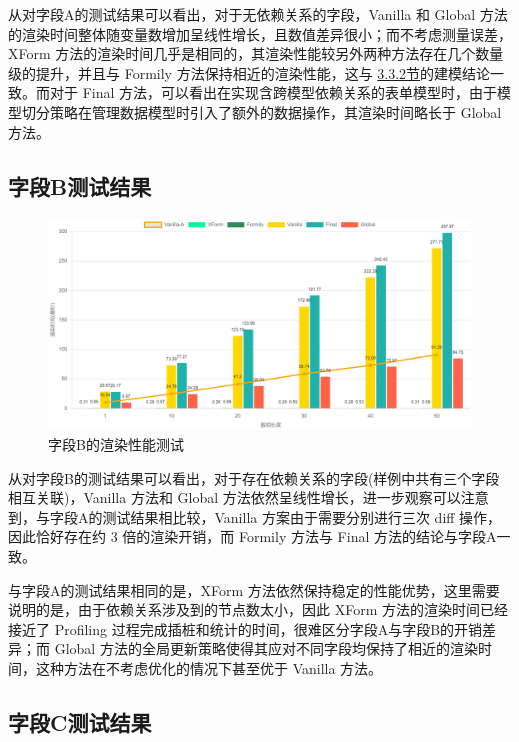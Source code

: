 \documentclass[winfonts,master,twoside]{njuthesis}
\begin{document}
从对字段A的测试结果可以看出，对于无依赖关系的字段，Vanilla 和 Global 方法的渲染时间整体随变量数增加呈线性增长，且数值差异很小；而不考虑测量误差， XForm 方法的渲染时间几乎是相同的，其渲染性能较另外两种方法存在几个数量级的提升，并且与 Formily 方法保持相近的渲染性能，这与 \hyperref[final-solution]{3.3.2节}的建模结论一致。而对于 Final 方法，可以看出在实现含跨模型依赖关系的表单模型时，由于模型切分策略在管理数据模型时引入了额外的数据操作，其渲染时间略长于 Global 方法。

\subsection{字段B测试结果}

\begin{figure}[h]
    \centering
    \includegraphics[width=\textwidth]{figure/chapter-5/B-update.png}
    \caption{字段B的渲染性能测试}
    \label{render-performence-testcase-B}
\end{figure}

从对字段B的测试结果可以看出，对于存在依赖关系的字段(样例中共有三个字段相互关联)，Vanilla 方法和 Global 方法依然呈线性增长，进一步观察可以注意到，与字段A的测试结果相比较，Vanilla 方案由于需要分别进行三次 diff 操作，因此恰好存在约 3 倍的渲染开销，而 Formily 方法与 Final 方法的结论与字段A一致。

与字段A的测试结果相同的是，XForm 方法依然保持稳定的性能优势，这里需要说明的是，由于依赖关系涉及到的节点数太小，因此 XForm 方法的渲染时间已经接近了 Profiling 过程完成插桩和统计的时间，很难区分字段A与字段B的开销差异；而 Global 方法的全局更新策略使得其应对不同字段均保持了相近的渲染时间，这种方法在不考虑优化的情况下甚至优于 Vanilla 方法。

\subsection{字段C测试结果}
\end{document}
